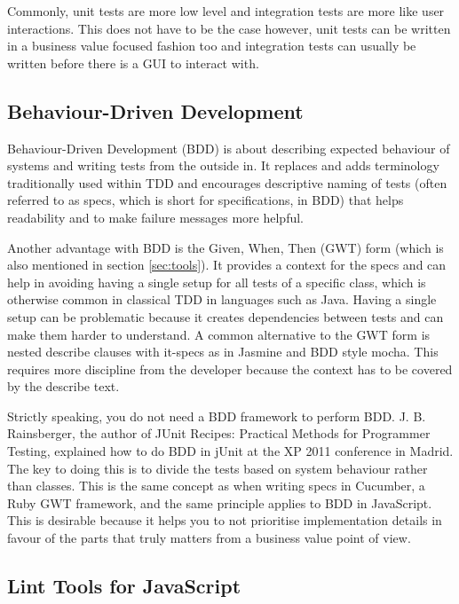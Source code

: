 \documentclass[11pt]{article}
\begin{document}
Commonly, unit tests are more low level and integration tests are more like user interactions. This does not have to be the case however, unit tests can be written in a business value focused fashion too and integration tests can usually be written before there is a GUI to interact with. \cite[question~20]{Ahnve}

\subsection{Behaviour-Driven Development}

Behaviour-Driven Development (BDD) is about describing expected behaviour of systems and writing tests from the outside in. It replaces and adds terminology traditionally used within TDD and encourages descriptive naming of tests (often referred to as specs, which is short for specifications, in BDD) that helps readability and to make failure messages more helpful. \cite[questions~17-18]{Ahnve}

Another advantage with BDD is the Given, When, Then (GWT) form (which is also mentioned in section \ref{sec:tools}). It provides a context for the specs and can help in avoiding having a single setup for all tests of a specific class, which is otherwise common in classical TDD in languages such as Java. Having a single setup can be problematic because it creates dependencies between tests and can make them harder to understand. A common alternative to the GWT form is nested describe clauses with it-specs as in Jasmine and BDD style mocha. This requires more discipline from the developer because the context has to be covered by the describe text. \cite[question~19]{Ahnve}

Strictly speaking, you do not need a BDD framework to perform BDD. J. B. Rainsberger, the author of JUnit Recipes: Practical Methods for Programmer Testing, explained how to do BDD in jUnit at the XP 2011 conference in Madrid. The key to doing this is to divide the tests based on system behaviour rather than classes. This is the same concept as when writing specs in Cucumber, a Ruby GWT framework, and the same principle applies to BDD in JavaScript. This is desirable because it helps you to not prioritise implementation details in favour of the parts that truly matters from a business value point of view.\cite[question~20]{Ahnve}

\subsection{Lint Tools for JavaScript}
\label{sec:Lint}
\end{document}
